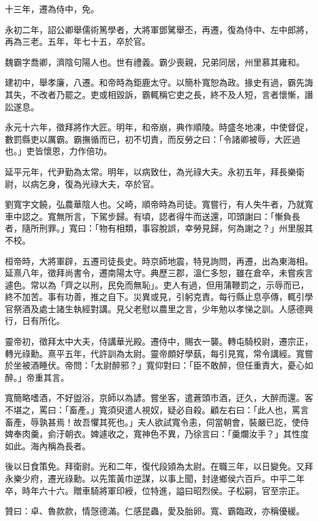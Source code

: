 \begin{pinyinscope}
十三年，遷為侍中，免。

永初二年，詔公卿舉儒術篤學者，大將軍鄧騭舉丕，再遷，復為侍中、左中郎將，再為三老。五年，年七十五，卒於官。

魏霸字喬卿，濟陰句陽人也。世有禮義。霸少喪親，兄弟同居，州里慕其雍和。

建初中，舉孝廉，八遷。和帝時為鉅鹿太守。以簡朴寬恕為政。掾史有過，霸先誨其失，不改者乃罷之。吏或相毀訴，霸輒稱它吏之長，終不及人短，言者懷慚，譖訟遂息。

永元十六年，徵拜將作大匠。明年，和帝崩，典作順陵。時盛冬地凍，中使督促，數罰縣吏以厲霸。霸撫循而已，初不切責，而反勞之曰：「令諸卿被辱，大匠過也。」吏皆懷恩，力作倍功。

延平元年，代尹勤為太常。明年，以病致仕，為光祿大夫。永初五年，拜長樂衛尉，以病乞身，復為光祿大夫，卒於官。

劉寬字文饒，弘農華陰人也。父崎，順帝時為司徒。寬嘗行，有人失牛者，乃就寬車中認之。寬無所言，下駕步歸。有頃，認者得牛而送還，叩頭謝曰：「慚負長者，隨所刑罪。」寬曰：「物有相類，事容脫誤，幸勞見歸，何為謝之？」州里服其不校。

桓帝時，大將軍辟，五遷司徒長史。時京師地震，特見詢問，再遷，出為東海相。延熹八年，徵拜尚書令，遷南陽太守。典歷三郡，溫仁多恕，雖在倉卒，未嘗疾言遽色。常以為「齊之以刑，民免而無恥」。吏人有過，但用蒲鞭罰之，示辱而已，終不加苦。事有功善，推之自下。災異或見，引躬克責。每行縣止息亭傳，輒引學官祭酒及處士諸生執經對講。見父老慰以農里之言，少年勉以孝悌之訓。人感德興行，日有所化。

靈帝初，徵拜太中大夫，侍講華光殿。遷侍中，賜衣一襲。轉屯騎校尉，遷宗正，轉光祿勳。熹平五年，代許訓為太尉。靈帝頗好學蓺，每引見寬，常令講經。寬嘗於坐被酒睡伏。帝問：「太尉醉邪？」寬仰對曰：「臣不敢醉，但任重責大，憂心如醉。」帝重其言。

寬簡略嗜酒，不好盥浴，京師以為諺。嘗坐客，遣蒼頭市酒，迂久，大醉而還。客不堪之，罵曰：「畜產。」寬須臾遣人視奴，疑必自殺。顧左右曰：「此人也，罵言畜產，辱孰甚焉！故吾懼其死也。」夫人欲試寬令恚，伺當朝會，裝嚴已訖，使侍婢奉肉羹，侴汙朝衣。婢遽收之，寬神色不異，乃徐言曰：「羹爛汝手？」其性度如此。海內稱為長者。

後以日食策免。拜衛尉。光和二年，復代段熲為太尉。在職三年，以日變免。又拜永樂少府，遷光祿勳。以先策黃巾逆謀，以事上聞，封逯鄉侯六百戶。中平二年卒，時年六十六。贈車騎將軍印綬，位特進，謚曰昭烈侯。子松嗣，官至宗正。

贊曰：卓、魯款款，情愨德滿。仁感昆蟲，愛及胎卵。寬、霸臨政，亦稱優緩。


\end{pinyinscope}